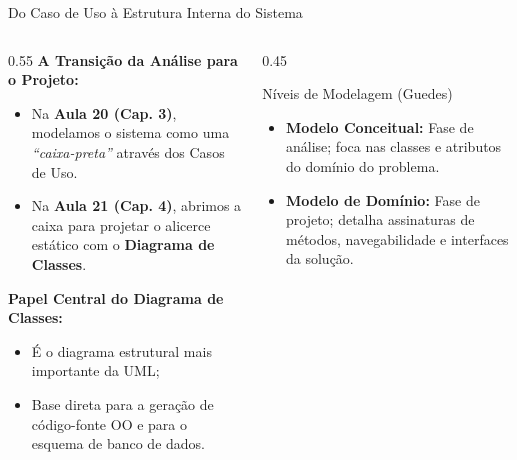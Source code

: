 \documentclass[10pt]{beamer}
\begin{document}
\begin{frame}{Do Caso de Uso à Estrutura Interna do Sistema}
    \begin{columns}
        \begin{column}{0.55\textwidth}
            \textbf{A Transição da Análise para o Projeto:}
            \begin{itemize}
                \item Na \textbf{Aula 20 (Cap. 3)}, modelamos o sistema como uma \textit{``caixa-preta''} através dos Casos de Uso.
                \item Na \textbf{Aula 21 (Cap. 4)}, abrimos a caixa para projetar o alicerce estático com o \textbf{Diagrama de Classes}.
            \end{itemize}
            \vspace{0.2cm}
            \textbf{Papel Central do Diagrama de Classes:}
            \begin{itemize}
                \item É o diagrama estrutural mais importante da UML;
                \item Base direta para a geração de código-fonte OO e para o esquema de banco de dados.
            \end{itemize}
        \end{column}
        \begin{column}{0.45\textwidth}
            \begin{block}{Níveis de Modelagem (Guedes)}
                \begin{itemize}
                    \item \textbf{Modelo Conceitual:} Fase de análise; foca nas classes e atributos do domínio do problema.
                    \item \textbf{Modelo de Domínio:} Fase de projeto; detalha assinaturas de métodos, navegabilidade e interfaces da solução.
                \end{itemize}
            \end{block}
        \end{column}
    \end{columns}
\end{frame}
\end{document}
